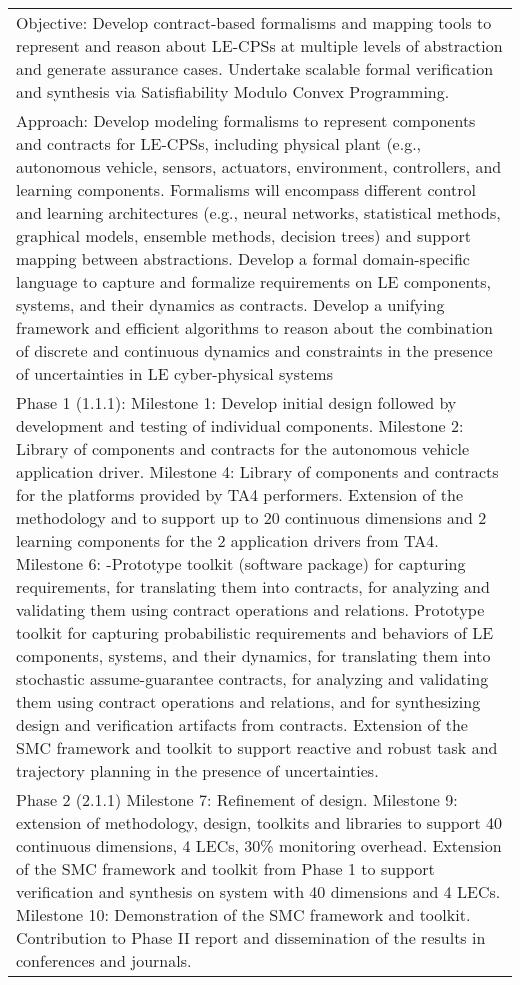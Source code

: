 {\begin{longtable} {|p{\textwidth} | }
\hline
\[\textcolor{blue} {\footnotesize {\textbf{Tasks 1.1.1, 2.1.1, 3.1.1 -Design for Assurance System Models and Formal Verification (USC)}}} \\ \hline\]
Objective:  Develop contract-based formalisms and mapping tools to represent and reason about LE-CPSs at multiple levels of abstraction and generate assurance cases.  Undertake scalable formal verification and synthesis via Satisfiability Modulo Convex Programming. \\ \hline
Approach:  Develop modeling formalisms to represent components and contracts for LE-CPSs, including physical plant (e.g., autonomous vehicle, sensors, actuators, environment, controllers, and learning components. Formalisms will encompass different control and learning architectures (e.g., neural networks, statistical methods, graphical models, ensemble methods, decision trees) and support mapping between abstractions.   Develop a formal domain-specific language to capture and formalize requirements on LE components, systems, and their dynamics as contracts.   Develop a unifying framework and efficient algorithms to reason about the combination of discrete and continuous dynamics and constraints in the presence of uncertainties in LE cyber-physical systems \\ \hline
Phase 1 (1.1.1):  Milestone 1: Develop initial design followed by development and testing of individual components.  Milestone 2:  Library of components and contracts for the autonomous vehicle application driver.  Milestone 4: Library of components and contracts for the platforms provided by TA4 performers. Extension of the methodology and to support up to 20 continuous dimensions and 2 learning components for the 2 application drivers from TA4.  Milestone 6: -Prototype toolkit (software package) for capturing requirements, for translating them into contracts, for analyzing and validating them using contract operations and relations.  Prototype toolkit for capturing probabilistic requirements and behaviors of LE components, systems, and their dynamics, for translating them into stochastic assume-guarantee contracts, for analyzing and validating them using contract operations and relations, and for synthesizing design and verification artifacts from contracts.  Extension of the SMC framework and toolkit to support reactive and robust task and trajectory planning in the presence of uncertainties. \\ \hline
Phase 2 (2.1.1) Milestone 7: Refinement of design.  Milestone 9: extension of methodology, design, toolkits and libraries to support 40 continuous dimensions, 4 LECs, 30\% monitoring overhead. Extension of the SMC framework and toolkit from Phase 1 to support verification and synthesis on system with 40 dimensions and 4 LECs.  Milestone 10: Demonstration of the SMC framework and toolkit.  Contribution to Phase II report and dissemination of the results in conferences and journals. \\ \hline

\end{longtable}}
